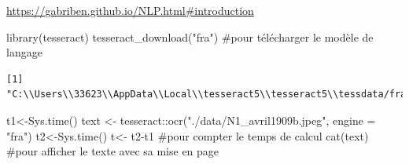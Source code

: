 \documentclass[
  letterpaper,
  DIV=11,
  numbers=noendperiod]{scrreprt}
\newenvironment{Shaded}{\begin{snugshade}}{\end{snugshade}}
\newcommand{\AttributeTok}[1]{\textcolor[rgb]{0.40,0.45,0.13}{#1}}
\newcommand{\CommentTok}[1]{\textcolor[rgb]{0.37,0.37,0.37}{#1}}
\newcommand{\FunctionTok}[1]{\textcolor[rgb]{0.28,0.35,0.67}{#1}}
\newcommand{\NormalTok}[1]{\textcolor[rgb]{0.00,0.23,0.31}{#1}}
\newcommand{\OtherTok}[1]{\textcolor[rgb]{0.00,0.23,0.31}{#1}}
\newcommand{\SpecialCharTok}[1]{\textcolor[rgb]{0.37,0.37,0.37}{#1}}
\newcommand{\StringTok}[1]{\textcolor[rgb]{0.13,0.47,0.30}{#1}}
\begin{document}
\url{https://gabriben.github.io/NLP.html\#introduction}

\begin{Shaded}
\begin{Highlighting}[]
\FunctionTok{library}\NormalTok{(tesseract)}
\FunctionTok{tesseract\_download}\NormalTok{(}\StringTok{"fra"}\NormalTok{) }\CommentTok{\#pour télécharger le modèle de langage}
\end{Highlighting}
\end{Shaded}

\begin{verbatim}
[1] "C:\\Users\\33623\\AppData\\Local\\tesseract5\\tesseract5\\tessdata/fra.traineddata"
\end{verbatim}

\begin{Shaded}
\begin{Highlighting}[]
\NormalTok{t1}\OtherTok{\textless{}{-}}\FunctionTok{Sys.time}\NormalTok{()}
\NormalTok{text }\OtherTok{\textless{}{-}}\NormalTok{ tesseract}\SpecialCharTok{::}\FunctionTok{ocr}\NormalTok{(}\StringTok{"./data/N1\_avril1909b.jpeg"}\NormalTok{, }\AttributeTok{engine =} \StringTok{"fra"}\NormalTok{)}
\NormalTok{t2}\OtherTok{\textless{}{-}}\FunctionTok{Sys.time}\NormalTok{()}
\NormalTok{t}\OtherTok{\textless{}{-}}\NormalTok{ t2}\SpecialCharTok{{-}}\NormalTok{t1 }\CommentTok{\#pour compter le temps de calcul}
\FunctionTok{cat}\NormalTok{(text) }\CommentTok{\#pour afficher le texte avec sa mise en page}
\end{Highlighting}
\end{Shaded}
\end{document}
